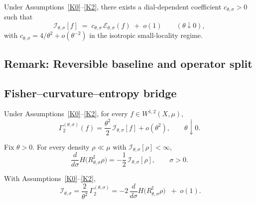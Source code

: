 		\begin{lemma}\label{lem:I-from-E}
			Under Assumptions~\ref{K0}--\ref{K2},
			there exists a dial-dependent coefficient $c_{\theta,\sigma}>0$ such that
			\[
 				\mathcal I_{\theta,\sigma}[f]
  				\;=\;
  				c_{\theta,\sigma}\,\mathcal E_{\theta,\sigma}(f)
 			 	\;+\; o(1)
  				\qquad (\theta\downarrow0),
			\]
			with $c_{\theta,\sigma}
  			= 4/\theta^{2} + o(\theta^{-2})$ in the isotropic small-locality regime.
		\end{lemma}
     
     	\subsection*{Remark: Reversible baseline and operator split}

  	\subsection{Fisher–curvature–entropy bridge}
  
		\begin{lemma}\label{lem:curv}
			Under Assumptions~\ref{K0}–\ref{K2}, for every
			$f\in W^{1,2}(X,\mu)$,
			\[
  				\Gamma_{2}^{(\theta,\sigma)}(f)
  				= \frac{\theta^{2}}{2}\,
   				\mathcal I_{\theta,\sigma}[f] + o(\theta^{2}),
  				\qquad \theta\downarrow0 .
			\]
		\end{lemma}

		\begin{lemma}\label{lem:deBruijn}
			Fix $\theta>0$.  
			For every density $\rho\ll\mu$ with $\mathcal I_{\theta,\sigma}[\rho]<\infty$,
			\[
  				\frac{d}{d\sigma}
  				H\!\bigl(R^{\sharp}_{\theta,\sigma}\rho\bigr)
  				= -\frac12\,\mathcal I_{\theta,\sigma}[\rho],
  				\qquad \sigma>0 .
			\]
		\end{lemma}


		\begin{theorem}\label{thm:bridge}
			With Assumptions~\ref{K0}–\ref{K2},
			\[
 		 		\boxed{\;
    				\mathcal I_{\theta,\sigma}
    				= \frac{2}{\theta^{2}}\,
        				\Gamma_{2}^{(\theta,\sigma)}
    				= -2\,\frac{d}{d\sigma}
        				H\!\bigl(R^{\sharp}_{\theta,\sigma}\rho\bigr)
 		 		\;}
  				\;+\; o(1).
			\]
		\end{theorem}
		
